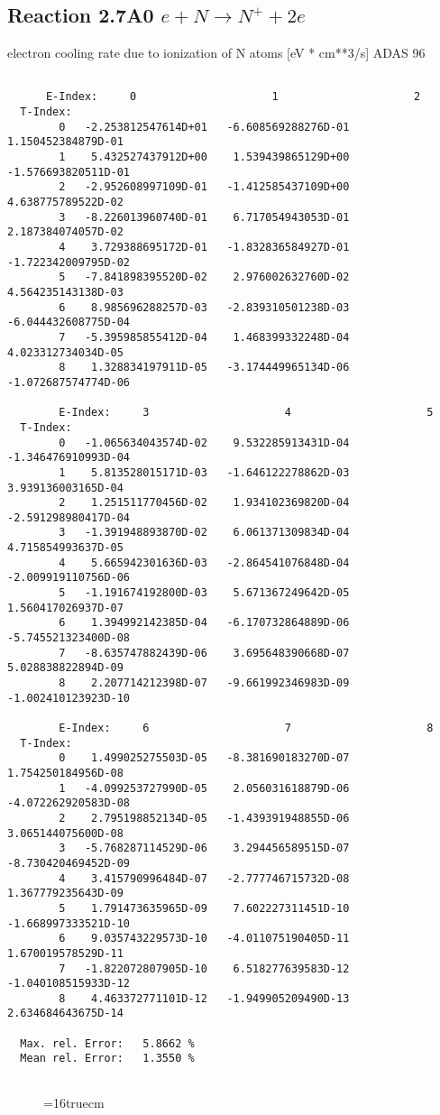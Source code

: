 \documentclass[12pt,dvipdfmx]{article}
\begin{document}
\subsection{
  Reaction 2.7A0  $e + N  \rightarrow N^+   + 2e $
}
electron cooling rate due to ionization of N atoms [eV * cm**3/s]
ADAS 96

\begin{small}\begin{verbatim}

      E-Index:     0                     1                     2
  T-Index:
        0   -2.253812547614D+01   -6.608569288276D-01    1.150452384879D-01
        1    5.432527437912D+00    1.539439865129D+00   -1.576693820511D-01
        2   -2.952608997109D-01   -1.412585437109D+00    4.638775789522D-02
        3   -8.226013960740D-01    6.717054943053D-01    2.187384074057D-02
        4    3.729388695172D-01   -1.832836584927D-01   -1.722342009795D-02
        5   -7.841898395520D-02    2.976002632760D-02    4.564235143138D-03
        6    8.985696288257D-03   -2.839310501238D-03   -6.044432608775D-04
        7   -5.395985855412D-04    1.468399332248D-04    4.023312734034D-05
        8    1.328834197911D-05   -3.174449965134D-06   -1.072687574774D-06

        E-Index:     3                     4                     5
  T-Index:
        0   -1.065634043574D-02    9.532285913431D-04   -1.346476910993D-04
        1    5.813528015171D-03   -1.646122278862D-03    3.939136003165D-04
        2    1.251511770456D-02    1.934102369820D-04   -2.591298980417D-04
        3   -1.391948893870D-02    6.061371309834D-04    4.715854993637D-05
        4    5.665942301636D-03   -2.864541076848D-04   -2.009919110756D-06
        5   -1.191674192800D-03    5.671367249642D-05    1.560417026937D-07
        6    1.394992142385D-04   -6.170732864889D-06   -5.745521323400D-08
        7   -8.635747882439D-06    3.695648390668D-07    5.028838822894D-09
        8    2.207714212398D-07   -9.661992346983D-09   -1.002410123923D-10

        E-Index:     6                     7                     8
  T-Index:
        0    1.499025275503D-05   -8.381690183270D-07    1.754250184956D-08
        1   -4.099253727990D-05    2.056031618879D-06   -4.072262920583D-08
        2    2.795198852134D-05   -1.439391948855D-06    3.065144075600D-08
        3   -5.768287114529D-06    3.294456589515D-07   -8.730420469452D-09
        4    3.415790996484D-07   -2.777746715732D-08    1.367779235643D-09
        5    1.791473635965D-09    7.602227311451D-10   -1.668997333521D-10
        6    9.035743229573D-10   -4.011075190405D-11    1.670019578529D-11
        7   -1.822072807905D-10    6.518277639583D-12   -1.040108515933D-12
        8    4.463372771101D-12   -1.949905209490D-13    2.634684643675D-14

  Max. rel. Error:   5.8662 %
  Mean rel. Error:   1.3550 %


\end{verbatim}\end{small}
\begin{figure} \label{2.7il}
\epsfxsize=16truecm 
\end{figure}
\newpage
\end{document}
